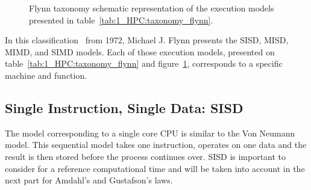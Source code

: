 \begin{table}
\centering
{}
\caption[Flynn's taxonomy]{Flynn's taxonomy presentation the execution models from Instructions and Data. The table is completed with SPMD and SIMT models.}
\label{tab:1_HPC:taxonomy_flynn}
\end{table}

\begin{figure}

\caption[Flynn's taxonomy schematics]{Flynn taxonomy schematic representation of the execution models presented in table~\ref{tab:1_HPC:taxonomy_flynn}.}
\label{fig:1_HPC:flynn_taxonomy}
\end{figure}

In this classification~\cite{flynn1972some} from 1972, Michael J. Flynn presents the SISD, MISD, MIMD, and SIMD models.
Each of those execution models, presented on table~\ref{tab:1_HPC:taxonomy_flynn} and figure~\ref{fig:1_HPC:flynn_taxonomy}, corresponds to a specific machine and function.

\subsection{Single Instruction, Single Data: SISD}
The model corresponding to a single core CPU is similar to the Von Neumann model. 
This sequential model takes one instruction, operates on one data and the result is then stored before the process continues over. 
SISD is important to consider for a reference computational time and will be taken into account in the next part for Amdahl's and Gustafson's laws.

